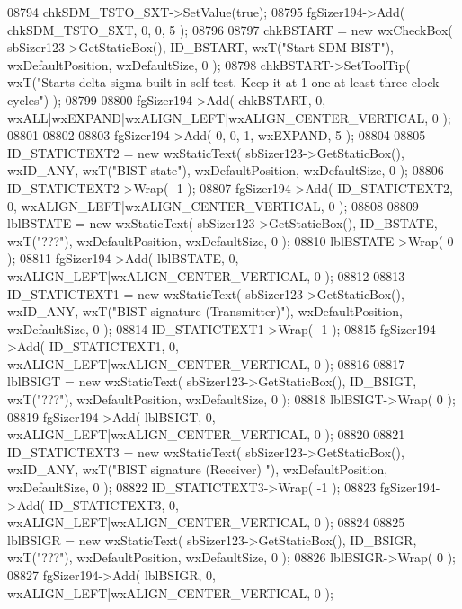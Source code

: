 \begin{DoxyCode}
08794     chkSDM_TSTO_SXT->SetValue(\textcolor{keyword}{true}); 
08795     fgSizer194->Add( chkSDM_TSTO_SXT, 0, 0, 5 );
08796     
08797     chkBSTART = \textcolor{keyword}{new} wxCheckBox( sbSizer123->GetStaticBox(), ID_BSTART, wxT(\textcolor{stringliteral}{"Start SDM BIST"}), 
      wxDefaultPosition, wxDefaultSize, 0 );
08798     chkBSTART->SetToolTip( wxT(\textcolor{stringliteral}{"Starts delta sigma built in self test. Keep it at 1 one at least three
       clock cycles"}) );
08799     
08800     fgSizer194->Add( chkBSTART, 0, wxALL|wxEXPAND|wxALIGN\_LEFT|wxALIGN\_CENTER\_VERTICAL, 0 );
08801     
08802     
08803     fgSizer194->Add( 0, 0, 1, wxEXPAND, 5 );
08804     
08805     ID_STATICTEXT2 = \textcolor{keyword}{new} wxStaticText( sbSizer123->GetStaticBox(), wxID\_ANY, wxT(\textcolor{stringliteral}{"BIST state"}), 
      wxDefaultPosition, wxDefaultSize, 0 );
08806     ID_STATICTEXT2->Wrap( -1 );
08807     fgSizer194->Add( ID_STATICTEXT2, 0, wxALIGN\_LEFT|wxALIGN\_CENTER\_VERTICAL, 0 );
08808     
08809     lblBSTATE = \textcolor{keyword}{new} wxStaticText( sbSizer123->GetStaticBox(), ID_BSTATE, wxT(\textcolor{stringliteral}{"???"}), wxDefaultPosition, 
      wxDefaultSize, 0 );
08810     lblBSTATE->Wrap( 0 );
08811     fgSizer194->Add( lblBSTATE, 0, wxALIGN\_LEFT|wxALIGN\_CENTER\_VERTICAL, 0 );
08812     
08813     ID_STATICTEXT1 = \textcolor{keyword}{new} wxStaticText( sbSizer123->GetStaticBox(), wxID\_ANY, wxT(\textcolor{stringliteral}{"BIST signature
       (Transmitter)"}), wxDefaultPosition, wxDefaultSize, 0 );
08814     ID_STATICTEXT1->Wrap( -1 );
08815     fgSizer194->Add( ID_STATICTEXT1, 0, wxALIGN\_LEFT|wxALIGN\_CENTER\_VERTICAL, 0 );
08816     
08817     lblBSIGT = \textcolor{keyword}{new} wxStaticText( sbSizer123->GetStaticBox(), ID_BSIGT, wxT(\textcolor{stringliteral}{"???"}), wxDefaultPosition, 
      wxDefaultSize, 0 );
08818     lblBSIGT->Wrap( 0 );
08819     fgSizer194->Add( lblBSIGT, 0, wxALIGN\_LEFT|wxALIGN\_CENTER\_VERTICAL, 0 );
08820     
08821     ID_STATICTEXT3 = \textcolor{keyword}{new} wxStaticText( sbSizer123->GetStaticBox(), wxID\_ANY, wxT(\textcolor{stringliteral}{"BIST signature (Receiver)
      "}), wxDefaultPosition, wxDefaultSize, 0 );
08822     ID_STATICTEXT3->Wrap( -1 );
08823     fgSizer194->Add( ID_STATICTEXT3, 0, wxALIGN\_LEFT|wxALIGN\_CENTER\_VERTICAL, 0 );
08824     
08825     lblBSIGR = \textcolor{keyword}{new} wxStaticText( sbSizer123->GetStaticBox(), ID_BSIGR, wxT(\textcolor{stringliteral}{"???"}), wxDefaultPosition, 
      wxDefaultSize, 0 );
08826     lblBSIGR->Wrap( 0 );
08827     fgSizer194->Add( lblBSIGR, 0, wxALIGN\_LEFT|wxALIGN\_CENTER\_VERTICAL, 0 );

\end{DoxyCode}
